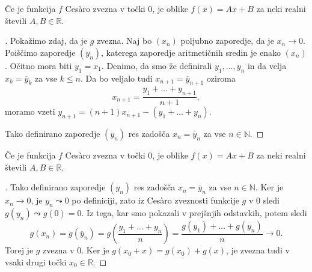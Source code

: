 \documentclass[10]{beamer}
\newenvironment{dokaz}{\begin{proof}[\bfseries\upshape\proofname]}{\end{proof}}
\begin{document}
\begin{frame}
    \begin{block}{}
        Če je funkcija $f$ Ces\`{a}ro zvezna v točki $0$, je oblike $f(x) = Ax + B$ za neki realni števili $A, B \in \mathbb{R}$.
    \end{block}
    \begin{dokaz}\renewcommand{\qedsymbol}{}
        Pokažimo zdaj, da je $g$ zvezna. Naj bo $(x_n)$ poljubno zaporedje, da je $x_n \rightarrow 0$. Poiščimo zaporedje $(y_n)$, katerega zaporedje aritmetičnih sredin je enako $(x_n)$. 
        \pause
        Očitno mora biti $y_1 = x_1$. Denimo, da smo že definirali $y_1, \ldots, y_n$ in da velja $x_k = \overline{y}_k$ za vse $k \leq n$. Da bo veljalo tudi $x_{n+1} = \overline{y}_{n+1}$ oziroma 
        $$x_{n+1} = \frac{y_1 + \ldots + y_{n+1}}{n+1},$$ 
        moramo vzeti $y_{n+1} = (n+1)x_{n+1} - (y_1 + \ldots + y_n)$. 
        \pause
        
        Tako definirano zaporedje $(y_n)$ res zadošča $x_n = \overline{y}_n$ za vse $n \in \mathbb{N}$.
    \end{dokaz}
\end{frame}

\begin{frame}
    \begin{block}{}
        Če je funkcija $f$ Ces\`{a}ro zvezna v točki $0$, je oblike $f(x) = Ax + B$ za neki realni števili $A, B \in \mathbb{R}$.
    \end{block}
    \begin{dokaz}\renewcommand{\qedsymbol}{}
        Tako definirano zaporedje $(y_n)$ res zadošča $x_n = \overline{y}_n$ za vse $n \in \mathbb{N}$. Ker je $x_n \rightarrow 0$, je $y_n \leadsto 0$ po definiciji, zato iz Ces\`{a}ro zveznosti funkcije $g$ v $0$ sledi $g(y_n) \leadsto g(0) = 0$. Iz tega, kar smo pokazali v prejšnjih odstavkih, potem sledi 
        $$g(x_n) = g(\overline{y}_n) = g(\frac{y_1 + \ldots + y_n}{n}) = \frac{g(y_1) + \ldots + g(y_n)}{n} \rightarrow 0.$$
        Torej je $g$ zvezna v $0$. Ker je $g(x_0 + x) = g(x_0) + g(x)$, je zvezna tudi v vsaki drugi točki $x_0 \in \mathbb{R}$.
    \end{dokaz}
\end{frame}
\end{document}

